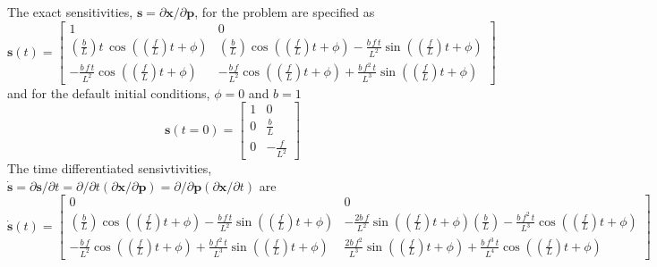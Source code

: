 The exact sensitivities, $\mathbf{s}=\partial\mathbf{x}/\partial\mathbf{p}$,
for the problem are specified as
\[
\mathbf{s}(t)=\left[\begin{array}{cc}
1 & 0\\
\left(\frac{b}{L}\right)t\,\cos\left(\left(\frac{f}{L}\right)t+\phi\right) & \left(\frac{b}{L}\right)\cos\left(\left(\frac{f}{L}\right)t+\phi\right)-\frac{b\, f\, t}{L^{2}}\sin\left(\left(\frac{f}{L}\right)t+\phi\right)\\
-\frac{b\, f\, t}{L^{2}}\cos\left(\left(\frac{f}{L}\right)t+\phi\right) & -\frac{b\, f}{L^{2}}\cos\left(\left(\frac{f}{L}\right)t+\phi\right)+\frac{b\, f^{2}\, t}{L^{3}}\sin\left(\left(\frac{f}{L}\right)t+\phi\right)
\end{array}\right]
\]
and for the default initial conditions, $\phi=0$ and $b=1$
\[
\mathbf{s}(t=0)=\left[\begin{array}{cc}
1 & 0\\
0 & \frac{b}{L}\\
0 & -\frac{f}{L^{2}}
\end{array}\right]
\]
The time differentiated sensivtivities, $\dot{\mathbf{s}}=\partial\mathbf{s}/\partial t=\partial/\partial t(\partial\mathbf{x}/\partial\mathbf{p})=\partial/\partial\mathbf{p}(\partial\mathbf{x}/\partial t)$
are
\[
\dot{\mathbf{s}}(t)=\left[\begin{array}{cc}
0 & 0\\
\left(\frac{b}{L}\right)\cos\left(\left(\frac{f}{L}\right)t+\phi\right)-\frac{b\, f\, t}{L^{2}}\sin\left(\left(\frac{f}{L}\right)t+\phi\right) & -\frac{2b\, f}{L^{2}}\sin\left(\left(\frac{f}{L}\right)t+\phi\right)\left(\frac{b}{L}\right)-\frac{b\, f^{2}\, t}{L^{3}}\cos\left(\left(\frac{f}{L}\right)t+\phi\right)\\
-\frac{b\, f}{L^{2}}\cos\left(\left(\frac{f}{L}\right)t+\phi\right)+\frac{b\, f^{2}\, t}{L^{3}}\sin\left(\left(\frac{f}{L}\right)t+\phi\right) & \frac{2b\, f^{2}}{L^{3}}\sin\left(\left(\frac{f}{L}\right)t+\phi\right)+\frac{b\, f^{3}\, t}{L^{4}}\cos\left(\left(\frac{f}{L}\right)t+\phi\right)
\end{array}\right]
\]

